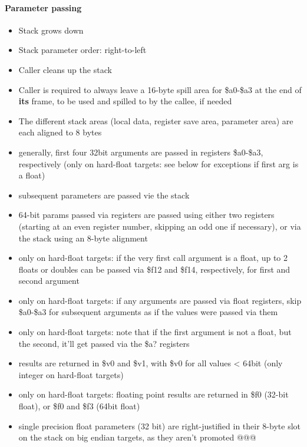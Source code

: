 \paragraph{Parameter passing}

\begin{itemize}
\item Stack grows down
\item Stack parameter order: right-to-left
\item Caller cleans up the stack
\item Caller is required to always leave a 16-byte spill area for \$a0-\$a3 at the end of {\bf its} frame, to be used and spilled to by the callee, if needed
\item The different stack areas (local data, register save area, parameter area) are each aligned to 8 bytes
\item generally, first four 32bit arguments are passed in registers \$a0-\$a3, respectively (only on hard-float targets: see below for exceptions if first arg is a float)
\item subsequent parameters are passed vie the stack
\item 64-bit params passed via registers are passed using either two registers (starting at an even register number, skipping an odd one if necessary), or via the stack using an 8-byte alignment
\item only on hard-float targets: if the very first call argument is a float, up to 2 floats or doubles can be passed via \$f12 and \$f14, respectively, for first and second argument
\item only on hard-float targets: if any arguments are passed via float registers, skip \$a0-\$a3 for subsequent arguments as if the values were passed via them
\item only on hard-float targets: note that if the first argument is not a float, but the second, it'll get passed via the \$a? registers
\item results are returned in \$v0 and \$v1, with \$v0 for all values < 64bit (only integer on hard-float targets)
\item only on hard-float targets: floating point results are returned in \$f0 (32-bit float), or \$f0 and \$f3 (64bit float)
\item single precision float parameters (32 bit) are right-justified in their 8-byte slot on the stack on big endian targets, as they aren't promoted @@@
\end{itemize}

